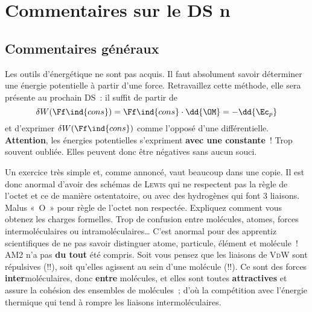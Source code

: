\documentclass[a4paper, 12pt, final, garamond]{book}
\begin{document}
\setcounter{chapter}{5}

\chapter{Commentaires sur le DS n}

\section{Commentaires généraux}

Les outils d'énergétique ne sont pas acquis. Il faut absolument savoir
déterminer une énergie potentielle à partir d'une force. Retravaillez cette
méthode, elle sera présente au prochain DS~: il suffit de partir de
\[
	\delta W(\Ff\ind{cons}) = \Ff\ind{cons}\cdot \dd{\OM} = -\dd{\Ec_p}
\]
et d'exprimer $\delta W(\Ff\ind{cons})$ comme l'opposé d'une différentielle.
\smallbreak
\textbf{Attention}, les énergies potentielles s'expriment \textbf{avec une
	constante}~! Trop souvent oubliée. Elles peuvent donc être négatives sans
aucun souci.


\setcounter{section}{0}
Un exercice très simple et, comme annoncé, vaut beaucoup dans une copie. Il est
donc anormal d'avoir des schémas de \textsc{Lewis} qui ne respectent pas la
règle de l'octet et ce de manière ostentatoire, ou avec des hydrogènes qui font
3 liaisons. Malus «~O~» pour règle de l'octet non respectée.
\smallbreak
Expliquez comment vous obtenez les charges formelles.
\smallbreak
Trop de confusion entre molécules, atomes, forces intermoléculaires ou
intramoléculaires… C'est anormal pour des apprentiz scientifiques de ne pas
savoir distinguer atome, particule, élément et molécule~!
\smallbreak
AM2 n'a pas \textbf{du tout} été compris. Soit vous pensez que les liaisons de
\textsc{VdW} sont répulsives (!!), soit qu'elles agissent au sein d'une molécule
(!!). Ce sont des forces \textbf{inter}moléculaires, donc \textbf{entre}
molécules, et elles sont toutes \textbf{attractives} et assure la cohésion des
ensembles de molécules~; d'où la compétition avec l'énergie thermique qui tend à
rompre les liaisons intermoléculaires.
\end{document}
